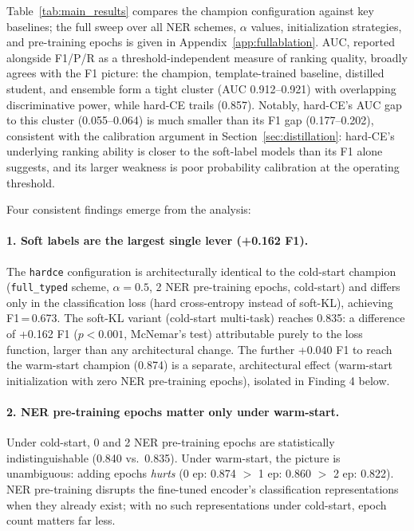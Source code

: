 \documentclass[11pt,twocolumn]{article}
\begin{document}
Table~\ref{tab:main_results} compares the champion configuration against
key baselines; the full sweep over all NER schemes, $\alpha$ values,
initialization strategies, and pre-training epochs is given in
Appendix~\ref{app:fullablation}. AUC, reported alongside F1/P/R as a
threshold-independent measure of ranking quality, broadly agrees with
the F1 picture: the champion, template-trained baseline, distilled
student, and ensemble form a tight cluster (AUC 0.912--0.921) with
overlapping discriminative power, while hard-CE trails (0.857).
Notably, hard-CE's AUC gap to this cluster (0.055--0.064) is much
smaller than its F1 gap (0.177--0.202), consistent with the calibration
argument in Section~\ref{sec:distillation}: hard-CE's underlying ranking
ability is closer to the soft-label models than its F1 alone suggests,
and its larger weakness is poor probability calibration at the
operating threshold.

Four consistent findings emerge from the analysis:

\paragraph{1. Soft labels are the largest single lever (+0.162 F1).}
The \texttt{hardce} configuration is architecturally identical to the
cold-start champion (\texttt{full\_typed} scheme, $\alpha{=}0.5$,
2 NER pre-training epochs, cold-start) and differs only in the
classification loss (hard cross-entropy instead of soft-KL), achieving
F1\,=\,0.673. The soft-KL variant (cold-start multi-task) reaches 0.835:
a difference of +0.162 F1 ($p{<}0.001$, McNemar's test) attributable
purely to the loss function, larger than any architectural change.
The further +0.040 F1 to reach the warm-start champion (0.874) is a
separate, architectural effect (warm-start initialization with zero
NER pre-training epochs), isolated in Finding 4 below.

\paragraph{2. NER pre-training epochs matter only under warm-start.}
Under cold-start, 0 and 2 NER pre-training epochs are statistically
indistinguishable (0.840 vs.\ 0.835). Under warm-start, the picture is
unambiguous: adding epochs \emph{hurts} (0 ep: 0.874 $>$ 1 ep: 0.860 $>$
2 ep: 0.822). NER pre-training disrupts the fine-tuned encoder's
classification representations when they already exist; with no such
representations under cold-start, epoch count matters far less.
\end{document}
